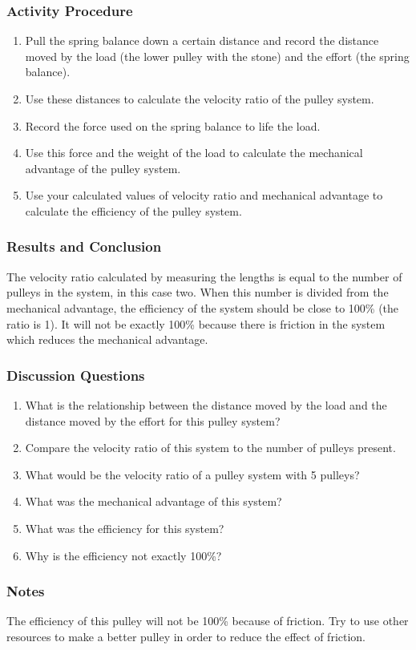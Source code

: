 \subsubsection*{Activity Procedure}
\begin{enumerate}
\item{Pull the spring balance down a certain distance and record the distance moved by the load (the lower pulley with the stone) and the effort (the spring balance).}
\item{Use these distances to calculate the velocity ratio of the pulley system.}
\item{Record the force used on the spring balance to life the load.}
\item{Use this force and the weight of the load to calculate the mechanical advantage of the pulley system.}
\item{Use your calculated values of velocity ratio and mechanical advantage to calculate the efficiency of the pulley system.}
\end{enumerate}

\subsubsection*{Results and Conclusion}
The velocity ratio calculated by measuring the lengths is equal to the number of pulleys in the system, in this case two.  When this number is divided from the mechanical advantage, the efficiency of the system should be close to 100\% (the ratio is 1).  It will not be exactly 100\% because there is friction in the system which reduces the mechanical advantage.


\subsubsection*{Discussion Questions}
\begin{enumerate}
\item{What is the relationship between the distance moved by the load and the distance moved by the effort for this pulley system?}
\item{Compare the velocity ratio of this system to the number of pulleys present.}
\item{What would be the velocity ratio of a pulley system with 5 pulleys?}
\item{What was the mechanical advantage of this system?}
\item{What was the efficiency for this system?}
\item{Why is the efficiency not exactly 100\%?}
\end{enumerate}

\subsubsection*{Notes}
The efficiency of this pulley will not be 100\% because of friction.  Try to use other resources to make a better pulley in order to reduce the effect of friction.
